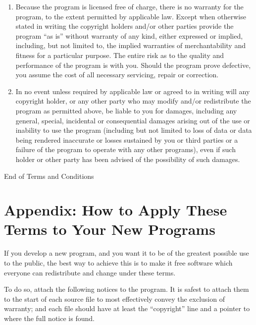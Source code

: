 \begin{lrbox}{\gpl}
\begin{minipage}{3\textwidth}
\begin{multicols}{3}
\begin{enumerate}
\begin{center}
{\Large\sc
No Warranty
}
\end{center}

\item
{\sc Because the program is licensed free of charge, there is no warranty
for the program, to the extent permitted by applicable law.  Except when
otherwise stated in writing the copyright holders and/or other parties
provide the program ``as is'' without warranty of any kind, either expressed
or implied, including, but not limited to, the implied warranties of
merchantability and fitness for a particular purpose.  The entire risk as
to the quality and performance of the program is with you.  Should the
program prove defective, you assume the cost of all necessary servicing,
repair or correction.}

\item
{\sc In no event unless required by applicable law or agreed to in writing
will any copyright holder, or any other party who may modify and/or
redistribute the program as permitted above, be liable to you for damages,
including any general, special, incidental or consequential damages arising
out of the use or inability to use the program (including but not limited
to loss of data or data being rendered inaccurate or losses sustained by
you or third parties or a failure of the program to operate with any other
programs), even if such holder or other party has been advised of the
possibility of such damages.}

\end{enumerate}


\begin{center}
{\Large\sc End of Terms and Conditions}
\end{center}


\pagebreak[2]

\section*{Appendix: How to Apply These Terms to Your New Programs}

If you develop a new program, and you want it to be of the greatest
possible use to the public, the best way to achieve this is to make it
free software which everyone can redistribute and change under these
terms.

  To do so, attach the following notices to the program.  It is safest to
  attach them to the start of each source file to most effectively convey
  the exclusion of warranty; and each file should have at least the
  ``copyright'' line and a pointer to where the full notice is found.


\end{multicols}
\end{minipage}
\end{lrbox}
